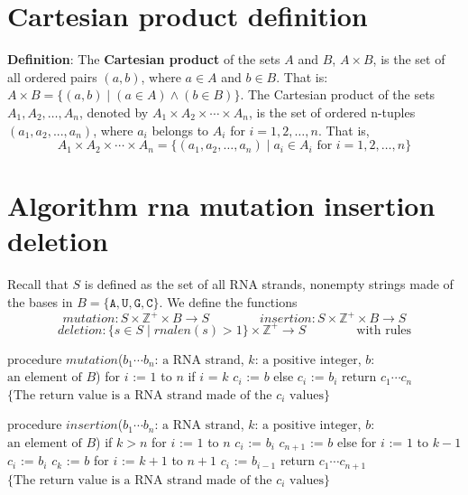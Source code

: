 \documentclass[12pt, oneside]{article}
\newcommand{\A}[0]{\texttt{A}}
\newcommand{\C}[0]{\texttt{C}}
\newcommand{\G}[0]{\texttt{G}}
\newcommand{\U}[0]{\texttt{U}}
\begin{document}
\section*{Cartesian product definition}


{\bf Definition}: The {\bf Cartesian product} of the sets $A$ and $B$, 
$A \times B$, is the set of all ordered pairs $(a, b)$, where $a \in A$ and $b \in B$. 
That is: $A \times B = \{(a, b) \mid (a \in A) \land (b \in B)\}$.
The Cartesian product of the sets $A_1, A_2, \ldots ,A_n$, denoted by 
$A_1 \times A_2 \times \cdots \times A_n$, is the
set of ordered n-tuples $(a_1, a_2,...,a_n)$, where $a_i$ belongs to 
$A_i$ for $i = 1, 2,\ldots,n$. That is,
\[
    A_1 \times A_2 \times \cdots \times A_n = \{(a_1, a_2,\ldots,a_n) \mid a_i \in A_i \textrm{ for } i = 1, 2,\ldots,n\}
\] \vfill
\section*{Algorithm rna mutation insertion deletion}


Recall that $S$ is defined as the set of all RNA strands, nonempty strings made of the bases in 
$B = \{\A,\U,\G,\C\}$. 
We define the functions 
\[
  \textit{mutation}: S \times \mathbb{Z}^+ \times B \to S
\qquad \qquad
  \textit{insertion}: S \times \mathbb{Z}^+ \times B \to S
\]
\[
  \textit{deletion}: \{ s\in S \mid rnalen(s) > 1\} \times \mathbb{Z}^+ \to S
  \qquad \qquad \textrm{with rules}
\]

\begin{algorithm}
procedure $\textit{mutation}$($b_1\cdots b_n$: $\textrm{a RNA strand}$, $k$: $\textrm{a  positive integer}$, $b$: $\textrm{an  element of } B$)
for $i$ := $1$ to $n$
  if $i$ = $k$
    $c_i$ := $b$
  else
    $c_i$ := $b_i$
return $c_1\cdots c_n$ $\{ \textrm{The return value is a RNA strand made of the } c_i \textrm{ values}\}$
\end{algorithm}

\begin{algorithm}
procedure $\textit{insertion}$($b_1\cdots b_n$: $\textrm{a RNA strand}$, $k$: $\textrm{a  positive integer}$, $b$: $\textrm{an  element of } B$)
if $k > n$
  for $i$ := $1$ to $n$
    $c_i$ := $b_i$
  $c_{n+1}$ := $b$
else 
  for $i$ := $1$ to $k-1$
    $c_i$ := $b_i$
  $c_k$ := $b$
  for $i$ := $k+1$ to $n+1$
    $c_i$ := $b_{i-1}$
return $c_1\cdots c_{n+1}$ $\{ \textrm{The return value is a RNA strand made of the } c_i \textrm{ values}\}$
\end{algorithm}
\end{document}
